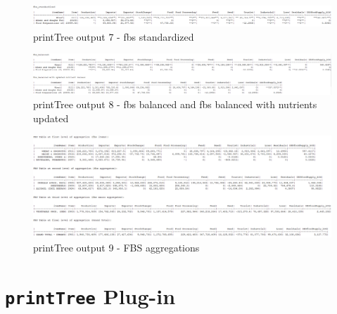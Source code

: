 \documentclass[]{article}
\begin{document}
\newpage

\begin{landscape}
\begin{figure}[H]

{\centering \includegraphics[width=1\linewidth]{images/printTree/07_standardized} 

}

\caption{\label{fig:f7}printTree output 7 - fbs standardized}\label{fig:f7}
\end{figure}

\begin{figure}[H]

{\centering \includegraphics[width=1\linewidth]{images/printTree/08_balanced_nutrients} 

}

\caption{\label{fig:f8}printTree output 8 - fbs balanced and fbs balanced with nutrients updated}\label{fig:f8}
\end{figure}

\begin{figure}[H]

{\centering \includegraphics[width=1\linewidth]{images/printTree/09_aggregations} 

}

\caption{\label{fig:f9}printTree output 9 - FBS aggregations}\label{fig:f9}
\end{figure}
\end{landscape}

\section{\texorpdfstring{\texttt{printTree}
Plug-in}{printTree Plug-in}}\label{printtree-plug-in}
\end{document}
